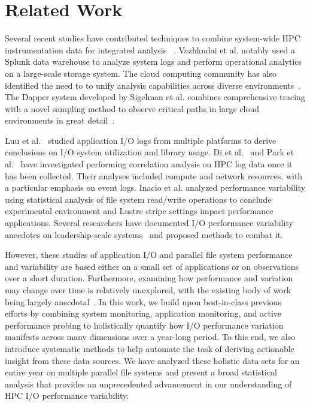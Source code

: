 \section{Related Work} \label{sec:related}

Several recent studies have contributed techniques to combine
system-wide HPC instrumentation data for integrated
analysis~\cite{Lockwood2017,Vazhkudai2017guide,Agelastos2014ldms,Kunkel2014siox,RIOT_2013}
. Vazhkudai et al. notably used a Splunk data warehouse to analyze system
logs and perform operational analytics on a large-scale storage system.
The cloud computing community has also identified the need to to unify
analysis capabilities across diverse environments~\cite{Vazhkudai2017guide}. The Dapper system
developed by Sigelman et al. combines comprehensive tracing with a novel
sampling method to observe critical paths in large cloud environments in great
detail~\cite{Sigelman2010dapper}.

Luu et al.~\cite{Luu:2015:HPDC} studied application I/O logs from multiple platforms to derive conclusions on I/O system utilization and library usage. Di et al.~\cite{7973730} and Park et al.~\cite{Park2017BigDM} have
investigated performing correlation analysis on HPC log data once it has been
collected.  Their analyses included compute and network resources, with a
particular emphasis on event logs. Inacio et al. analyzed performance variability using statistical analysis of file system read/write operations to conclude experimental environment and Lustre stripe settings impact performance applications. 
Several researchers have documented 
I/O performance variability anecdotes on leadership-scale
systems~\cite{Lofstead2010,Yildiz2016,carns2011understanding} and proposed
methods to combat it.  

However, these studies of application I/O and parallel file system performance and variability are based either on a small set of applications or on observations over a short duration.
Furthermore, examining how performance and variation may change over time is relatively unexplored, with the existing body of work being largely anecdotal~\cite{Haryadi2018fail}.
In this work, we build upon best-in-class previous efforts by combining system monitoring, application monitoring, and active performance probing
to holistically quantify how I/O performance variation manifests across many dimensions over a year-long period.
To this end, we also introduce systematic methods to help automate the task of deriving actionable insight from these data sources.
We have analyzed these holistic data sets for an entire year on multiple parallel file systems and present a broad statistical analysis that provides an unprecedented advancement in our understanding of HPC I/O performance variability.
